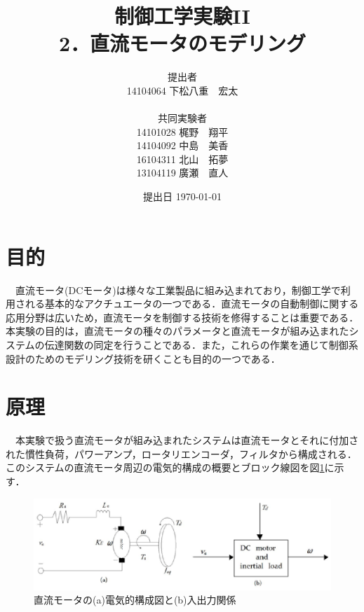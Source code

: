 \documentclass[11pt,a4paper]{jsarticle}
\begin{document}
\title{制御工学実験II \\ 2．直流モータのモデリング}
\author{提出者 \\ 14104064 下松八重　宏太 \\ \\ 共同実験者 \\ 14101028 梶野　翔平 \\ 14104092 中島　美香 \\ 16104311 北山　拓夢 \\ 13104119 廣瀬　直人}
\date{提出日 \today}



\maketitle
\thispagestyle{empty}
\newpage


 \section{目的}
 　直流モータ(DCモータ)は様々な工業製品に組み込まれており，制御工学で利用される基本的なアクチュエータの一つである．直流モータの自動制御に関する応用分野は広いため，直流モータを制御する技術を修得することは重要である．本実験の目的は，直流モータの種々のパラメータと直流モータが組み込まれたシステムの伝達関数の同定を行うことである．また，これらの作業を通じて制御系設計のためのモデリング技術を研くことも目的の一つである．
 \section{原理}
 　本実験で扱う直流モータが組み込まれたシステムは直流モータとそれに付加された慣性負荷，パワーアンプ，ロータリエンコーダ，フィルタから構成される．このシステムの直流モータ周辺の電気的構成の概要とブロック線図を図\ref{block1}に示す．
 
 \begin{figure}[bp]
  \begin{center}
   \includegraphics[scale = .8]{./picture/block1.eps}
   \caption{直流モータの(a)電気的構成図と(b)入出力関係}
   \label{block1}
  \end{center}
 \end{figure}
\end{document}
